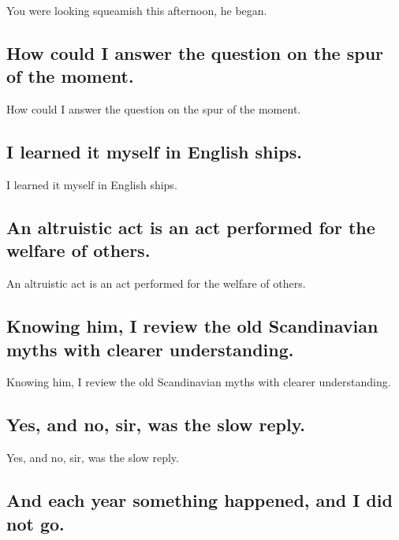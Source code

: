\documentclass[]{article}
\begin{document}
You were looking squeamish this afternoon, he began.

\hypertarget{how-could-i-answer-the-question-on-the-spur-of-the-moment.}{%
\subsection{How could I answer the question on the spur of the
moment.}\label{how-could-i-answer-the-question-on-the-spur-of-the-moment.}}

How could I answer the question on the spur of the moment.

\hypertarget{i-learned-it-myself-in-english-ships.}{%
\subsection{I learned it myself in English
ships.}\label{i-learned-it-myself-in-english-ships.}}

I learned it myself in English ships.

\hypertarget{an-altruistic-act-is-an-act-performed-for-the-welfare-of-others.}{%
\subsection{An altruistic act is an act performed for the welfare of
others.}\label{an-altruistic-act-is-an-act-performed-for-the-welfare-of-others.}}

An altruistic act is an act performed for the welfare of others.

\hypertarget{knowing-him-i-review-the-old-scandinavian-myths-with-clearer-understanding.}{%
\subsection{Knowing him, I review the old Scandinavian myths with
clearer
understanding.}\label{knowing-him-i-review-the-old-scandinavian-myths-with-clearer-understanding.}}

Knowing him, I review the old Scandinavian myths with clearer
understanding.

\hypertarget{yes-and-no-sir-was-the-slow-reply.}{%
\subsection{Yes, and no, sir, was the slow
reply.}\label{yes-and-no-sir-was-the-slow-reply.}}

Yes, and no, sir, was the slow reply.

\hypertarget{and-each-year-something-happened-and-i-did-not-go.}{%
\subsection{And each year something happened, and I did not
go.}\label{and-each-year-something-happened-and-i-did-not-go.}}
\end{document}
